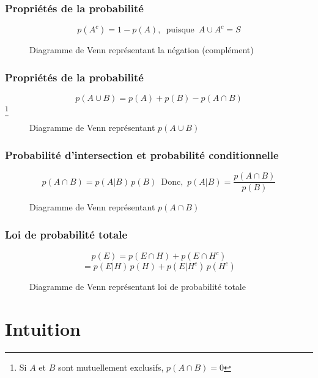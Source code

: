 \documentclass{beamer}
\begin{document}
\begin{frame}
    \frametitle{Propriétés de la probabilité}
    \[p(A^c) = 1 - p(A), \,\,\, \textrm{puisque} \,\,\, A \cup A^c = S\]
    \begin{figure}
      \centering
      \scalebox{1}{}
      \caption{Diagramme de Venn représentant la négation (complément)}
    \end{figure}
\end{frame}


\begin{frame}
    \frametitle{Propriétés de la probabilité}
    \[p(A \cup B) = p(A) + p(B) - p(A \cap B)\]\footnote{
        Si $A$ et $B$ sont mutuellement exclusifs, $p(A \cap B) = 0$
    }
    \begin{figure}
      \centering
      \scalebox{1}{}
      \caption{Diagramme de Venn représentant $p(A \cup B)$}
    \end{figure}    
\end{frame}


\begin{frame}
    \frametitle{Probabilité d'intersection et probabilité conditionnelle}
    \[p(A \cap B) = p(A | B) \, p(B) \,\,\, \textrm{Donc,} \,\,\, p(A | B) = \frac{p(A \cap B)}{p(B)}\]

    \begin{figure}
      \centering
      
      \caption{Diagramme de Venn représentant $p(A \cap B)$}
    \end{figure}
\end{frame}


\begin{frame}
    \frametitle{Loi de probabilité totale}

    \[p(E) = p(E \cap H) + p(E \cap H^c)\]
    \[ = p(E | H) \, p(H) + p(E | H^c) \, p(H^c)\]

    \begin{figure}
      \centering
      
      \caption{Diagramme de Venn représentant loi de probabilité totale}
    \end{figure}
\end{frame}



\section{Intuition}
\end{document}
